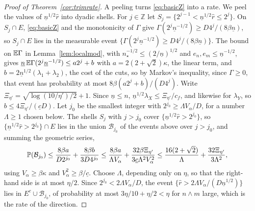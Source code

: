 \begin{proof}[Proof of Theorem~\ref{cor:trimrate}]
A peeling turns \eqref{eq:basicZ} into a rate. We peel the values of $\underline n^{1/2}\widehat r$ into dyadic shells. For
$j\in\mathbb Z$ let $S_j=\{2^{j-1}<\underline n^{1/2}\widehat r\le2^j\}$. On $S_j\cap E$, \eqref{eq:basicZ} and the monotonicity of
$\Gamma$ give $\Gamma(2^j\underline n^{-1/2})\ge D4^j/(8\beta\underline n)$, so $S_j\cap E$ lies in the measurable
event $\{\Gamma(2^j\underline n^{-1/2})\ge D4^j/(8\beta\underline n)\}$. The bound on $\mathbb{E} \Gamma$ in Lemma~\ref{lem:localmod}, with $n_\star^{-1/2}\le(2/\underline n)^{1/2}$ and $e_n,e_m\le\underline n^{-1/2}$, gives
$\underline n\,\mathbb{E} \Gamma(2^j\underline n^{-1/2})\le a2^j+b$ with $a=2(2+\sqrt2)\kappa$, the linear term, and
$b=2\underline n^{1/2}(\lambda_1+\lambda_2)$, the cost
of the cuts, so by Markov's inequality, since
$\Gamma\ge0$, that event has probability at most $8\beta(a2^j+b)/(D4^j)$. Write $\Xi_{\eta'}=\sqrt{\log(10/\eta')/2}+1$.
Since $\underline n\le n$, $\underline n^{1/2}\lambda_X\le\Xi_{\eta'}/c_f$, and likewise for $\lambda_Y$, so
$b\le4\Xi_{\eta'}/(\underline cD)$. Let $j_0$ be the smallest integer with $2^{j_0}\ge\Lambda V_\alpha/D$, for a
number $\Lambda\ge1$ chosen below. The shells $S_j$ with $j>j_0$ cover $\{\underline n^{1/2}\widehat r>2^{j_0}\}$, so
$\{\underline n^{1/2}\widehat r>2^{j_0}\}\cap E$ lies in the union $\mathcal B_{j_0}$ of the events above over $j>j_0$, and summing the geometric
series,
\[
\mathbb{P}(\mathcal B_{j_0})\le\frac{8\beta a}{D2^{j_0}}+\frac{8\beta b}{3D4^{j_0}}
\le\frac{8\beta a}{\Lambda V_\alpha}+\frac{32\beta\Xi_{\eta'}}{3\underline c\Lambda^2V_\alpha^2}
\le\frac{16(2+\sqrt2)}\Lambda+\frac{32\Xi_{\eta'}}{3\Lambda^2},
\]
using $V_\alpha\ge\beta\kappa$ and $V_\alpha^2\ge\beta/\underline c$. Choose $\Lambda$, depending only on $\eta$, so
that the right-hand side is at most $\eta/2$. Since $2^{j_0}<2\Lambda V_\alpha/D$, the event
$\{\widehat r>2\Lambda V_\alpha/(D\underline n^{1/2})\}$ lies in $E^c\cup\mathcal B_{j_0}$, of probability at most $3\eta/10+\eta/2<
\eta$ for $n\wedge m$ large, which is the rate of the direction.


\end{proof}
